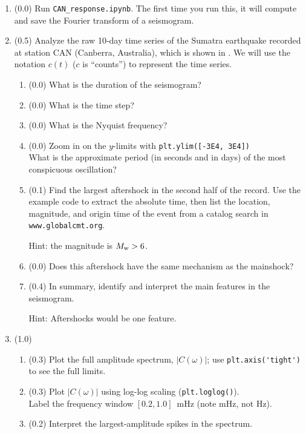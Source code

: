 \documentclass[11pt,titlepage,fleqn]{article}
\newcommand{\tfileresponse}{{\tt CAN\_response.ipynb}}
\begin{document}
\begin{enumerate}

\item (0.0) Run \tfileresponse. The first time you run this, it will compute and save the Fourier transform of a seismogram.



\item (0.5) Analyze the raw 10-day time series of the Sumatra earthquake recorded at station CAN (Canberra, Australia), which is shown in . We will use the notation $c(t)$ ($c$ is ``counts'') to represent the time series.

\begin{enumerate}
\item (0.0) What is the duration of the seismogram?
\item (0.0) What is the time step?
\item (0.0) What is the Nyquist frequency?
\item (0.0) Zoom in on the $y$-limits with \verb+plt.ylim([-3E4, 3E4])+ \\
What is the approximate period (in seconds and in days) of the most conspicuous oscillation?
\item (0.1) Find the largest aftershock in the second half of the record. Use the example code to extract the absolute time, then list the location, magnitude, and origin time of the event from a catalog search in \verb+www.globalcmt.org+.

Hint: the magnitude is $M_{\rm w} > 6$.

\item (0.0) Does this aftershock have the same mechanism as the mainshock?
\item (0.4) In summary, identify and interpret the main features in the seismogram.

Hint: Aftershocks would be one feature.
\end{enumerate}


\item (1.0)
\begin{enumerate}
\item (0.3) Plot the full amplitude spectrum, $|C(\omega)|$; use \verb+plt.axis('tight')+ to see the full limits.
\item (0.3) Plot $|C(\omega)|$ using log-log scaling (\verb+plt.loglog()+). \\
Label the frequency window $[0.2,1.0]$~mHz (note mHz, not Hz).
\item (0.2) Interpret the largest-amplitude spikes in the spectrum.


\end{enumerate}
\end{enumerate}
\end{document}
